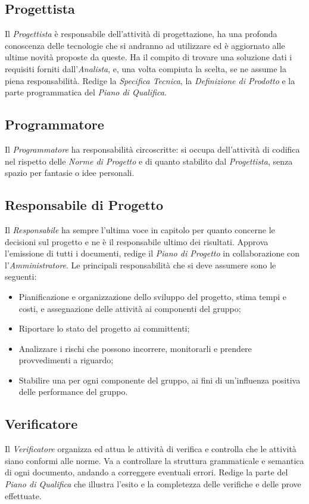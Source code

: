 \subsection{Progettista}
Il \textit{Progettista} è responsabile dell'attività di progettazione, ha una profonda conoscenza delle tecnologie che si andranno ad utilizzare ed è aggiornato alle ultime novità proposte da queste. Ha il compito di trovare una soluzione dati i requisiti forniti dall'\textit{Analista}, e, una volta compiuta la scelta, se ne assume la piena responsabilità. Redige la \textit{Specifica Tecnica}, la \textit{Definizione di Prodotto} e la parte programmatica del \textit{Piano di Qualifica}.

\subsection{Programmatore}
Il \textit{Programmatore} ha responsabilità circoscritte: si occupa dell'attività di codifica nel rispetto delle \textit{Norme di Progetto} e di quanto stabilito dal \textit{Progettista}, senza spazio per fantasie o idee personali.

\subsection{Responsabile di Progetto}
Il \textit{Responsabile} ha sempre l'ultima voce in capitolo per quanto concerne le decisioni sul progetto e ne è il responsabile ultimo dei risultati. Approva l'emissione di tutti i documenti, redige il \textit{Piano di Progetto} in collaborazione con l'\textit{Amministratore}. Le principali responsabilità che si deve assumere sono le seguenti:
\begin{itemize}
\item Pianificazione e organizzazione dello sviluppo del progetto, stima tempi e costi, e assegnazione delle attività ai componenti del gruppo;
\item Riportare lo stato del progetto ai committenti;
\item Analizzare i rischi che possono incorrere, monitorarli e prendere provvedimenti a riguardo;
\item Stabilire una  per ogni componente del gruppo, ai fini di un'influenza positiva delle performance del gruppo.
\end{itemize}

\subsection{Verificatore}
Il \textit{Verificatore} organizza ed attua le attività di verifica e controlla che le attività siano conformi
alle norme. Va a controllare la struttura grammaticale e semantica di ogni documento, andando a correggere eventuali errori. Redige la parte del \textit{Piano di Qualifica} che illustra l'esito e la completezza delle verifiche e delle prove effettuate.